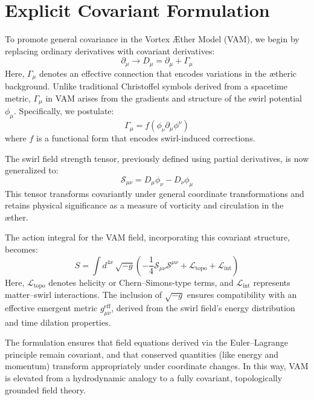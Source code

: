 \documentclass[a4paper,12pt]{article}
\begin{document}
    \appendix
    \section{Explicit Covariant Formulation}
        To promote general covariance in the Vortex \AE{}ther Model (VAM), we begin by replacing ordinary derivatives with covariant derivatives:
        \begin{equation}
            \partial_\mu \rightarrow D_\mu = \partial_\mu + \Gamma_\mu
        \end{equation}
        Here, $\Gamma_\mu$ denotes an effective connection that encodes variations in the ætheric background. Unlike traditional Christoffel symbols derived from a spacetime metric, $\Gamma_\mu$ in VAM arises from the gradients and structure of the swirl potential $\phi_\mu$. Specifically, we postulate:
        \begin{equation}
            \Gamma_\mu = f(\phi_\nu \partial_\mu \phi^\nu)
        \end{equation}
        where $f$ is a functional form that encodes swirl-induced corrections.

        The swirl field strength tensor, previously defined using partial derivatives, is now generalized to:
        \begin{equation}
            \mathcal{S}_{\mu\nu} = D_\mu \phi_\nu - D_\nu \phi_\mu
        \end{equation}
        This tensor transforms covariantly under general coordinate transformations and retains physical significance as a measure of vorticity and circulation in the æther.

        The action integral for the VAM field, incorporating this covariant structure, becomes:
        \begin{equation}
            S = \int d^{4x} \, \sqrt{-g} \left( -\frac{1}{4} \mathcal{S}_{\mu\nu} \mathcal{S}^{\mu\nu} + \mathcal{L}_{\text{topo}} + \mathcal{L}_{\text{int}} \right)
        \end{equation}
        Here, $\mathcal{L}_{\text{topo}}$ denotes helicity or Chern–Simons-type terms, and $\mathcal{L}_{\text{int}}$ represents matter–swirl interactions. The inclusion of $\sqrt{-g}$ ensures compatibility with an effective emergent metric $g_{\mu\nu}^{\text{eff}}$, derived from the swirl field's energy distribution and time dilation properties.

        The formulation ensures that field equations derived via the Euler–Lagrange principle remain covariant, and that conserved quantities (like energy and momentum) transform appropriately under coordinate changes. In this way, VAM is elevated from a hydrodynamic analogy to a fully covariant, topologically grounded field theory.
\end{document}
